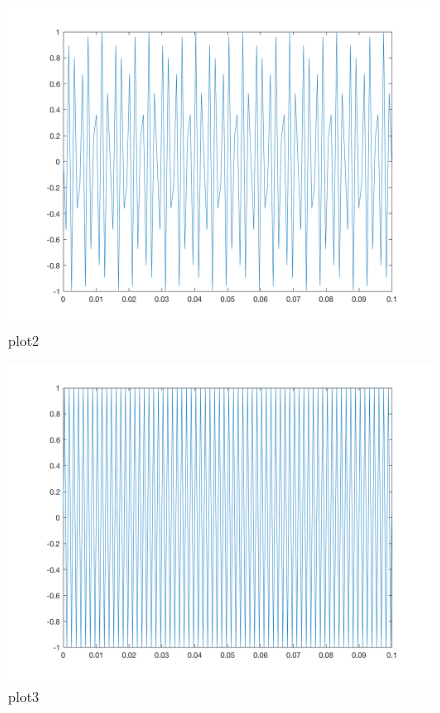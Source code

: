 \documentclass{article}
\begin{document}
\begin{figure}[h!]
    \centering
    \includegraphics[scale=0.25]{plot2.png}
    \caption{plot2}
    \label{fig:plot2}
\end{figure}

\begin{figure}[h!]
    \centering
    \includegraphics[scale=0.25]{plot3.png}
    \caption{plot3}
    \label{fig:plot3}
\end{figure}
\newpage
\end{document}
